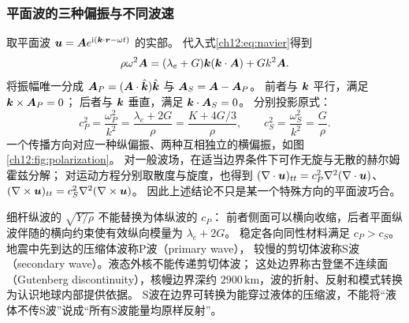\subsubsection{平面波的三种偏振与不同波速}

取平面波 $\bm{u}=\bm{A} e^{\mathrm i(\bm{k}\cdot\bm{r}-\omega t)}$ 的实部。
代入式\eqref{ch12:eq:navier}得到
\[
 \rho\omega^2\bm{A}=(\lambda_e+G)\bm{k}(\bm{k}\cdot\bm{A})+Gk^2\bm{A}.
\]
将振幅唯一分成
$\bm{A}_P=(\bm{A}\cdot\hat{\bm{k}})\hat{\bm{k}}$ 与
$\bm{A}_S=\bm{A}-\bm{A}_P$。
前者与 $\bm{k}$ 平行，满足 $\bm{k}\times\bm{A}_P=0$；
后者与 $\bm{k}$ 垂直，满足 $\bm{k}\cdot\bm{A}_S=0$。
分别投影原式：
\begin{equation}
 c_P^2=\frac{\omega_P^2}{k^2}=\frac{\lambda_e+2G}{\rho}
      =\frac{K+4G/3}{\rho},\qquad
 c_S^2=\frac{\omega_S^2}{k^2}=\frac G\rho.
 \label{ch12:eq:body-speeds}
\end{equation}
一个传播方向对应一种纵偏振、两种互相独立的横偏振，如图\ref{ch12:fig:polarization}。
对一般波场，在适当边界条件下可作无旋与无散的赫尔姆霍兹分解；
对运动方程分别取散度与旋度，也得到
$(\nabla\cdot\bm{u})_{tt}=c_P^2\nabla^2(\nabla\cdot\bm{u})$、
$(\nabla\times\bm{u})_{tt}=c_S^2\nabla^2(\nabla\times\bm{u})$。
因此上述结论不只是某一个特殊方向的平面波巧合。

\begin{center}\begin{minipage}{\linewidth}\centering
{}
\label{ch12:fig:polarization}
\end{minipage}\end{center}

细杆纵波的 $\sqrt{Y/\rho}$ 不能替换为体纵波的 $c_P$：
前者侧面可以横向收缩，后者平面纵波伴随的横向约束使有效纵向模量为 $\lambda_e+2G$。
稳定各向同性材料满足 $c_P>c_S$。地震中先到达的压缩体波称P波（primary wave），
较慢的剪切体波称S波（secondary wave）。液态外核不能传递剪切体波；
这处边界称古登堡不连续面（Gutenberg discontinuity），核幔边界深约 $2900\,\mathrm{km}$，波的折射、反射和模式转换为认识地球内部提供依据。
S波在边界可转换为能穿过液体的压缩波，不能将“液体不传S波”说成“所有S波能量均原样反射”。


